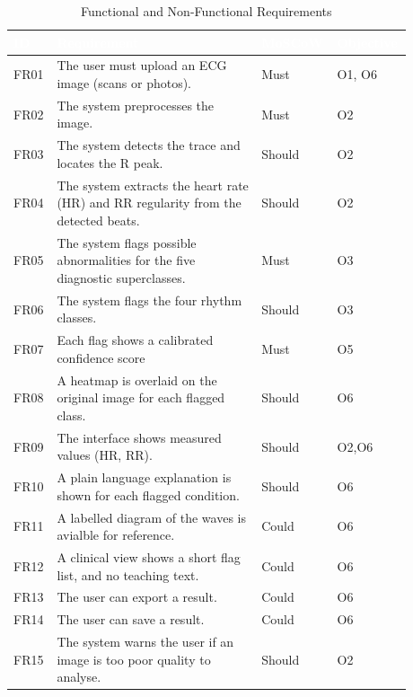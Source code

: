 \begin{table}[ht]
  \centering
  \footnotesize
  \setlength{\arrayrulewidth}{0.8pt}      %
  \renewcommand{\arraystretch}{1}       %
  \caption{Functional and Non-Functional Requirements}
  \label{tab:functional-req}
  \begin{tabular}{|p{0.08\linewidth}|p{0.5\linewidth}|p{0.15\linewidth}|p{0.15\linewidth}|}
    \hline
    \rowcolor{cyan!90!black}
    \textcolor{white}{\textbf{ID}} & \textcolor{white}{\textbf{Requirement}} &
    \textcolor{white}{\textbf{MoSCoW}} & \textcolor{white}{\textbf{Objective}} \\
    \hline
    FR01 & The user must upload an ECG image (scans or photos). & Must & O1, O6 \\
    \hline
    FR02 & The system preprocesses the image. & Must & O2 \\
    \hline
    FR03 & The system detects the trace and locates the R peak. & Should & O2 \\
    \hline
    FR04 & The system extracts the heart rate (HR) and RR regularity from the detected beats. & Should & O2 \\
    \hline
    FR05 & The system flags possible abnormalities for the five diagnostic superclasses. & Must & O3 \\
    \hline
    FR06 & The system flags the four rhythm classes. & Should & O3 \\
    \hline
    FR07 & Each flag shows a calibrated confidence score & Must & O5 \\
    \hline
    FR08 & A heatmap is overlaid on the original image for each flagged class. & Should & O6 \\
    \hline
    FR09 & The interface shows measured values (HR, RR). & Should & O2,O6 \\
    \hline
    FR10 & A plain language explanation is shown for each flagged condition. & Should & O6 \\
    \hline
    FR11 & A labelled diagram of the waves is avialble for reference. & Could & O6 \\
    \hline
    FR12 & A clinical view shows a short flag list, and no teaching text. & Could & O6 \\
    \hline
    FR13 & The user can export a result. & Could & O6 \\
    \hline
    FR14 & The user can save a result. & Could & O6 \\
    \hline
    FR15 & The system warns the user if an image is too poor quality to analyse. & Should & O2 \\

\end{tabular}
\end{table}
